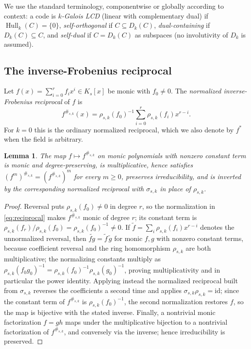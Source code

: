 \documentclass[11pt,a4paper]{article}
\newcommand{\Hull}{\operatorname{Hull}}
\newcommand{\Dk}{D_k}
\numberwithin{equation}{section}
\theoremstyle{plain}
\newtheorem{lemma}[theorem]{Lemma}
\theoremstyle{definition}
\theoremstyle{remark}
\begin{document}
We use the standard terminology, componentwise or globally according to
context: a code is \emph{$k$-Galois LCD} (linear with complementary dual) if
$\Hull_k(C)=\{0\}$, \emph{self-orthogonal} if $C\subseteq\Dk(C)$,
\emph{dual-containing} if $\Dk(C)\subseteq C$, and \emph{self-dual} if
$C=\Dk(C)$ as subspaces (no involutivity of $\Dk$ is assumed).

\subsection{The inverse-Frobenius reciprocal}\label{sec:reciprocal}

Let $f(x)=\sum_{i=0}^{r}f_ix^i\in K_s[x]$ be monic with $f_0\neq0$.  The
\emph{normalized inverse-Frobenius reciprocal} of $f$ is
\begin{equation}\label{eq:reciprocal}
f^{\#_{s,k}}(x)
   =\rho_{s,k}(f_0)^{-1}\sum_{i=0}^{r}\rho_{s,k}(f_i)x^{r-i}.
\end{equation}
For $k=0$ this is the ordinary normalized reciprocal, which we also denote by
$f^\ast$ when the field is arbitrary.

\begin{lemma}\label{lem:reciprocal}
The map $f\mapsto f^{\#_{s,k}}$ on monic polynomials with nonzero constant term
is monic and degree-preserving, is multiplicative, hence satisfies
$(f^m)^{\#_{s,k}}=(f^{\#_{s,k}})^m$ for every $m\geq0$, preserves
irreducibility, and is inverted by the corresponding normalized reciprocal with
$\sigma_{s,k}$ in place of $\rho_{s,k}$.
\end{lemma}

\begin{proof}
Reversal puts $\rho_{s,k}(f_0)\neq0$ in degree $r$, so the normalization in
\eqref{eq:reciprocal} makes $f^{\#_{s,k}}$ monic of degree $r$; its constant
term is $\rho_{s,k}(f_r)/\rho_{s,k}(f_0)=\rho_{s,k}(f_0)^{-1}\neq0$.  If
$\widetilde{f}=\sum_i\rho_{s,k}(f_i)x^{r-i}$ denotes the unnormalized reversal,
then $\widetilde{fg}=\widetilde{f}\,\widetilde{g}$ for monic $f,g$ with nonzero
constant terms, because coefficient reversal and the ring homomorphism
$\rho_{s,k}$ are both multiplicative; the normalizing constants multiply as
$\rho_{s,k}(f_0g_0)^{-1}=\rho_{s,k}(f_0)^{-1}\rho_{s,k}(g_0)^{-1}$, proving
multiplicativity and in particular the power identity.  Applying instead the
normalized reciprocal built from $\sigma_{s,k}$ reverses the coefficients a
second time and applies $\sigma_{s,k}\rho_{s,k}=\mathrm{id}$; since the constant
term of $f^{\#_{s,k}}$ is $\rho_{s,k}(f_0)^{-1}$, the second normalization
restores $f$, so the map is bijective with the stated inverse.  Finally, a
nontrivial monic factorization $f=gh$ maps under the multiplicative bijection
to a nontrivial factorization of $f^{\#_{s,k}}$, and conversely via the inverse;
hence irreducibility is preserved.
\end{proof}
\end{document}
